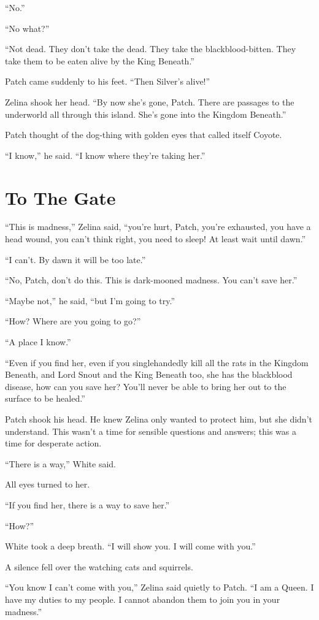 \documentclass[ebook,oneside,openany,17pt]{memoir}
\renewcommand{\thechapter}{\Roman{chapter}}
\newcounter{sections}
\newcommand{\sections}[1]{%
  \section*{#1}
  \addtocounter{sections}{1}%
  \pdfbookmark[1]{#1}{section.\thechapter.\thesections}}
\begin{document}
“No.”

“No what?”

“Not dead. They don’t take the dead. They take the
blackblood-bitten. They take them to be eaten alive by the King
Beneath.”

Patch came suddenly to his feet. “Then Silver’s alive!”

Zelina shook her head. “By now she’s gone, Patch. There are passages
to the underworld all through this island. She’s gone into the Kingdom
Beneath.”

Patch thought of the dog-thing with golden eyes that called itself
Coyote.

“I know,” he said. “I know where they’re taking her.”


\sections{To The Gate}

“This is madness,” Zelina said, “you’re hurt, Patch, you’re exhausted,
you have a head wound, you can’t think right, you need to sleep! At
least wait until dawn.”

“I can’t. By dawn it will be too late.”

“No, Patch, don’t do this. This is dark-mooned madness. You can’t save
her.”

“Maybe not,” he said, “but I’m going to try.”

“How? Where are you going to go?”

“A place I know.”

“Even if you find her, even if you singlehandedly kill all the rats in
the Kingdom Beneath, and Lord Snout and the King Beneath too, she has
the blackblood disease, how can you save her? You’ll never be able to
bring her out to the surface to be healed.”

Patch shook his head. He knew Zelina only wanted to protect him, but
she didn’t understand. This wasn’t a time for sensible questions and
answers; this was a time for desperate action.

“There is a way,” White said.

All eyes turned to her.

“If you find her, there is a way to save her.”

“How?”

White took a deep breath. “I will show you. I will come with you.”

A silence fell over the watching cats and squirrels.

“You know I can’t come with you,” Zelina said quietly to Patch. “I am
a Queen. I have my duties to my people. I cannot abandon them to join
you in your madness.”
\end{document}
